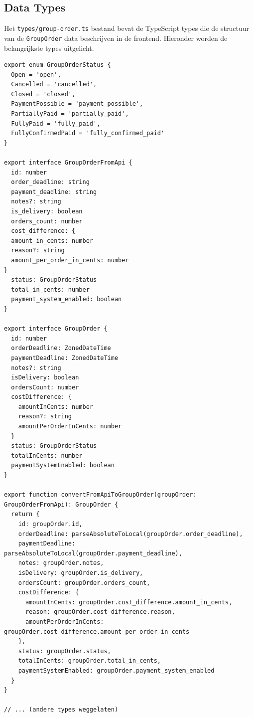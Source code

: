 \subsection{Data Types}

Het \texttt{types/group-order.ts} bestand bevat de TypeScript types die de structuur van de \texttt{GroupOrder} data beschrijven in de frontend. Hieronder worden de belangrijkste types uitgelicht.

\begin{verbatim}
export enum GroupOrderStatus {
  Open = 'open',
  Cancelled = 'cancelled',
  Closed = 'closed',
  PaymentPossible = 'payment_possible',
  PartiallyPaid = 'partially_paid',
  FullyPaid = 'fully_paid',
  FullyConfirmedPaid = 'fully_confirmed_paid'
}

export interface GroupOrderFromApi {
  id: number
  order_deadline: string
  payment_deadline: string
  notes?: string
  is_delivery: boolean
  orders_count: number
  cost_difference: {
  amount_in_cents: number
  reason?: string
  amount_per_order_in_cents: number
}
  status: GroupOrderStatus
  total_in_cents: number
  payment_system_enabled: boolean
}

export interface GroupOrder {
  id: number
  orderDeadline: ZonedDateTime
  paymentDeadline: ZonedDateTime
  notes?: string
  isDelivery: boolean
  ordersCount: number
  costDifference: {
    amountInCents: number
    reason?: string
    amountPerOrderInCents: number
  }
  status: GroupOrderStatus
  totalInCents: number
  paymentSystemEnabled: boolean
}

export function convertFromApiToGroupOrder(groupOrder: GroupOrderFromApi): GroupOrder {
  return {
    id: groupOrder.id,
    orderDeadline: parseAbsoluteToLocal(groupOrder.order_deadline),
    paymentDeadline: parseAbsoluteToLocal(groupOrder.payment_deadline),
    notes: groupOrder.notes,
    isDelivery: groupOrder.is_delivery,
    ordersCount: groupOrder.orders_count,
    costDifference: {
      amountInCents: groupOrder.cost_difference.amount_in_cents,
      reason: groupOrder.cost_difference.reason,
      amountPerOrderInCents: groupOrder.cost_difference.amount_per_order_in_cents
    },
    status: groupOrder.status,
    totalInCents: groupOrder.total_in_cents,
    paymentSystemEnabled: groupOrder.payment_system_enabled
  }
}

// ... (andere types weggelaten)
\end{verbatim}
\label{lst:grouporder_types_frontend}

